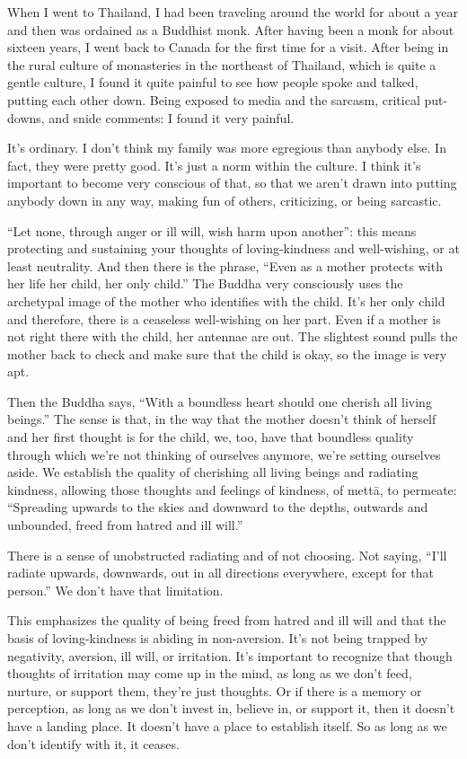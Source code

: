 When I went to Thailand, I had been traveling around the world for about
a year and then was ordained as a Buddhist monk. After having been a
monk for about sixteen years, I went back to Canada for the first time
for a visit. After being in the rural culture of monasteries in the
northeast of Thailand, which is quite a gentle culture, I found it quite
painful to see how people spoke and talked, putting each other down.
Being exposed to media and the sarcasm, critical put-downs, and snide
comments: I found it very painful.

It’s ordinary. I don’t think my family was more egregious than anybody
else. In fact, they were pretty good. It’s just a norm within the
culture. I think it’s important to become very conscious of that, so
that we aren’t drawn into putting anybody down in any way, making fun of
others, criticizing, or being sarcastic.

“Let none, through anger or ill will, wish harm upon another”: this
means protecting and sustaining your thoughts of loving-kindness and
well-wishing, or at least neutrality. And then there is the phrase,
“Even as a mother protects with her life her child, her only child.” The
Buddha very consciously uses the archetypal image of the mother who
identifies with the child. It’s her only child and therefore, there is a
ceaseless well-wishing on her part. Even if a mother is not right there
with the child, her antennae are out. The slightest sound pulls the
mother back to check and make sure that the child is okay, so the image
is very apt.

Then the Buddha says, “With a boundless heart should one cherish all
living beings.” The sense is that, in the way that the mother doesn’t
think of herself and her first thought is for the child, we, too, have
that boundless quality through which we’re not thinking of ourselves
anymore, we’re setting ourselves aside. We establish the quality of
cherishing all living beings and radiating kindness, allowing those
thoughts and feelings of kindness, of mettā, to permeate: “Spreading
upwards to the skies and downward to the depths, outwards and unbounded,
freed from hatred and ill will.”

There is a sense of unobstructed radiating and of not choosing. Not
saying, “I’ll radiate upwards, downwards, out in all directions
everywhere, except for that person.” We don’t have that limitation.

This emphasizes the quality of being freed from hatred and ill will and
that the basis of loving-kindness is abiding in non-aversion. It’s not
being trapped by negativity, aversion, ill will, or irritation. It’s
important to recognize that though thoughts of irritation may come up in
the mind, as long as we don’t feed, nurture, or support them, they’re
just thoughts. Or if there is a memory or perception, as long as we
don’t invest in, believe in, or support it, then it doesn’t have a
landing place. It doesn’t have a place to establish itself. So as long
as we don’t identify with it, it ceases.

